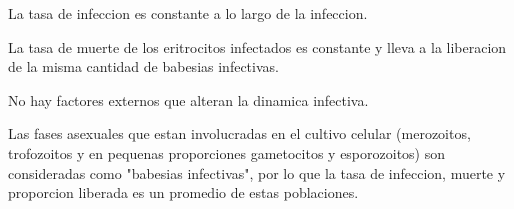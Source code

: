 \documentclass[11pt,a4paper]{article}
\begin{document}
La tasa de infeccion es constante a lo largo de la infeccion.

La tasa de muerte de los eritrocitos infectados es constante y lleva a la liberacion de la misma cantidad de babesias infectivas.

No hay factores externos que alteran la dinamica infectiva.

Las fases asexuales que estan involucradas en el cultivo celular (merozoitos, trofozoitos y en pequenas proporciones gametocitos y esporozoitos) son consideradas como "babesias infectivas", por lo que la tasa de infeccion, muerte y proporcion liberada es un promedio de estas poblaciones.
\end{document}
